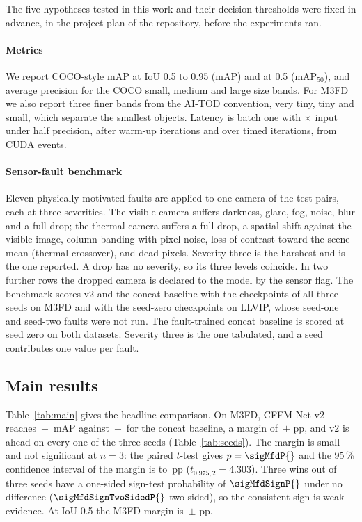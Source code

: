 The five hypotheses tested in this work and their decision thresholds were fixed in advance, in the project plan of the repository, before the experiments ran.

\paragraph{Metrics}
We report COCO-style mAP at IoU 0.5 to 0.95 (mAP) and at 0.5 (mAP$_{50}$), and average precision for the COCO small, medium and large size bands. For M3FD we also report three finer bands from the AI-TOD convention, very tiny, tiny and small, which separate the smallest objects. Latency is batch one with \cfgLatH{}$\times$\cfgLatW{} input under half precision, after \cfgLatWarmup{} warm-up iterations and over \cfgLatIters{} timed iterations, from CUDA events.

\paragraph{Sensor-fault benchmark}
Eleven physically motivated faults are applied to one camera of the test pairs, each at three severities. The visible camera suffers darkness, glare, fog, noise, blur and a full drop; the thermal camera suffers a full drop, a spatial shift against the visible image, column banding with pixel noise, loss of contrast toward the scene mean (thermal crossover), and dead pixels. Severity three is the harshest and is the one reported. A drop has no severity, so its three levels coincide. In two further rows the dropped camera is declared to the model by the sensor flag. The benchmark scores v2 and the concat baseline with the checkpoints of all three seeds on M3FD and with the seed-zero checkpoints on LLVIP, whose seed-one and seed-two faults were not run. The fault-trained concat baseline is scored at seed zero on both datasets. Severity three is the one tabulated, and a seed contributes one value per fault.

\subsection{Main results}
\label{sec:main}
Table~\ref{tab:main} gives the headline comparison. On M3FD, CFFM-Net v2 reaches \resMfdCffmVtwoMeanMap{}\,$\pm$\,\resMfdCffmVtwoStdMap{} mAP against \resMfdConcatMdMeanMap{}\,$\pm$\,\resMfdConcatMdStdMap{} for the concat baseline, a margin of \marMfdVtwoVsConcatMdMeanMap{}\,$\pm$\,\marMfdVtwoVsConcatMdStdMap{}\,pp, and v2 is ahead on every one of the three seeds (Table~\ref{tab:seeds}). The margin is small and not significant at $n=3$: the paired $t$-test gives $p=\sigMfdP{}$ and the 95\,\% confidence interval of the margin is \sigMfdCiLow{} to \sigMfdCiHigh{}\,pp ($t_{0.975,2}=4.303$). Three wins out of three seeds have a one-sided sign-test probability of $\sigMfdSignP{}$ under no difference ($\sigMfdSignTwoSidedP{}$ two-sided), so the consistent sign is weak evidence. At IoU 0.5 the M3FD margin is \marMfdVtwoVsConcatMdMeanMapFifty{}\,$\pm$\,\marMfdVtwoVsConcatMdStdMapFifty{}\,pp.

